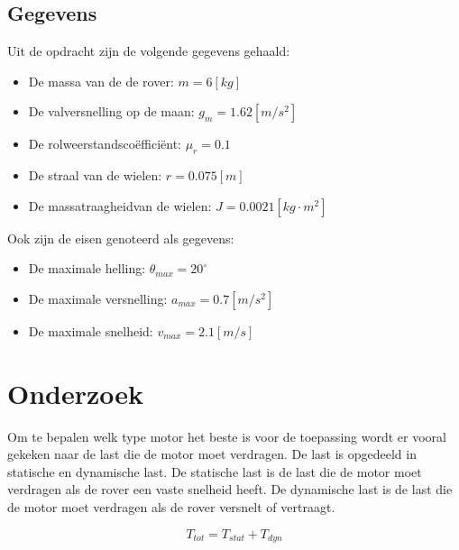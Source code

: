 \documentclass{article}
\begin{document}
        \subsection{Gegevens}
            Uit de opdracht zijn de volgende gegevens gehaald:
            \begin{itemize}
                \item De massa van de de rover: $m = 6[kg]$
                \item De valversnelling op de maan: $g_m = 1.62[m/s^2]$
                \item De rolweerstandscoëfficiënt: $\mu_r = 0.1$
                \item De straal van de wielen: $r = 0.075[m]$
                \item De massatraagheidvan de wielen: $J = 0.0021[kg \cdot m^2]$
            \end{itemize}
            Ook zijn de eisen genoteerd als gegevens:
            \begin{itemize}
                \item De maximale helling: $\theta_{max} = 20^\circ$
                \item De maximale versnelling: $a_{max} = 0.7[m/s^2]$
                \item De maximale snelheid: $v_{max} = 2.1[m/s]$
            \end{itemize}

    \section{Onderzoek}
        Om te bepalen welk type motor het beste is voor de toepassing wordt er vooral gekeken naar de last die de motor moet verdragen.
        De last is opgedeeld in statische en dynamische last. 
        De statische last is de last die de motor moet verdragen als de rover een vaste snelheid heeft.
        De dynamische last is de last die de motor moet verdragen als de rover versnelt of vertraagt.

        \begin{equation}
            T_{tot} = T_{stat} + T_{dyn} 
        \end{equation}


\end{document}

